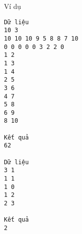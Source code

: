 Ví dụ
\begin{verbatim}
Dữ liệu
10 3
10 10 10 9 5 8 8 7 10
0 0 0 0 0 3 2 2 0
1 2
1 3
1 4
2 5
3 6
4 7
5 8
6 9
8 10

Kết quả
62

Dữ liệu
3 1
1 1
1 0
1 2
2 3

Kết quả
2
\end{verbatim}
